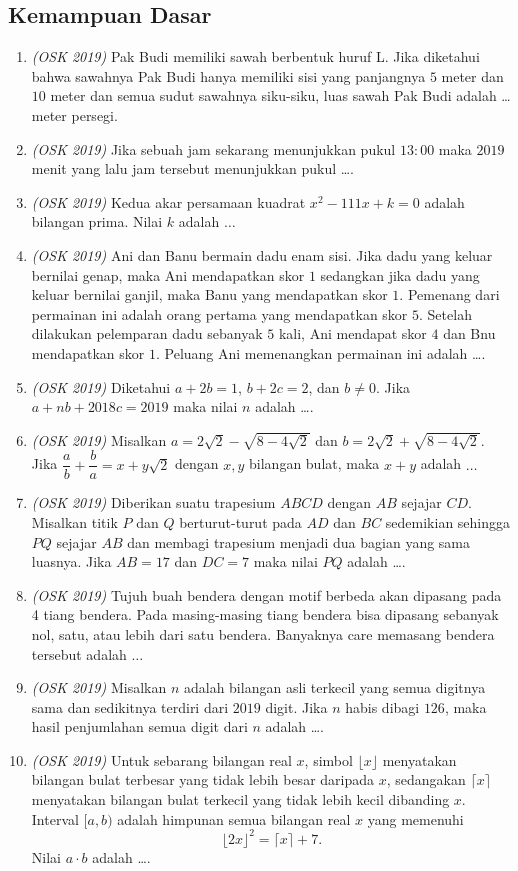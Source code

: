 \subsection{Kemampuan Dasar}
\begin{enumerate}
	\item \textit{(OSK 2019)} Pak Budi memiliki sawah berbentuk huruf L. Jika diketahui bahwa sawahnya Pak Budi hanya memiliki sisi yang panjangnya $5$ meter dan $10$ meter dan semua sudut sawahnya siku-siku, luas sawah Pak Budi adalah \dots meter persegi.
	\item \textit{(OSK 2019)} Jika sebuah jam sekarang menunjukkan pukul $13:00$ maka $2019$ menit yang lalu jam tersebut menunjukkan pukul \dots. 
	\item \textit{(OSK 2019)} Kedua akar persamaan kuadrat $x^2-111x+k=0$ adalah bilangan prima. Nilai $k$ adalah $\dots$
	\item \textit{(OSK 2019)} Ani dan Banu bermain dadu enam sisi. Jika dadu yang keluar bernilai genap, maka Ani mendapatkan skor $1$ sedangkan jika dadu yang keluar bernilai ganjil, maka Banu yang mendapatkan skor $1$. Pemenang dari permainan ini adalah orang pertama yang mendapatkan skor $5$. Setelah dilakukan pelemparan dadu sebanyak $5$ kali, Ani mendapat skor $4$ dan Bnu mendapatkan skor $1$. Peluang Ani memenangkan permainan ini adalah \dots.
	\item \textit{(OSK 2019)} Diketahui $a+2b=1$, $b+2c=2$, dan $b\neq 0$. Jika $a+nb+2018c=2019$ maka nilai $n$ adalah \dots.
	\item \textit{(OSK 2019)} Misalkan $a=2\sqrt{2}-\sqrt{8-4\sqrt{2}}$ dan $b=2\sqrt{2}+\sqrt{8-4\sqrt{2}}$. Jika $\dfrac{a}{b}+\dfrac{b}{a}=x+y\sqrt{2}$ dengan $x,y$ bilangan bulat, maka $x+y$ adalah $\dots$
	\item \textit{(OSK 2019)} Diberikan suatu trapesium $ABCD$ dengan $AB$ sejajar $CD$. Misalkan titik $P$ dan $Q$ berturut-turut pada $AD$ dan $BC$ sedemikian sehingga $PQ$ sejajar $AB$ dan membagi trapesium menjadi dua bagian yang sama luasnya. Jika $AB=17$ dan $DC=7$ maka nilai $PQ$ adalah \dots.
	\item \textit{(OSK 2019)} Tujuh buah bendera dengan motif berbeda akan dipasang pada 4 tiang bendera. Pada masing-masing tiang bendera bisa dipasang sebanyak nol, satu, atau lebih dari satu bendera. Banyaknya care memasang bendera tersebut adalah $\dots$
	\item \textit{(OSK 2019)} Misalkan $n$ adalah bilangan asli terkecil yang semua digitnya sama dan sedikitnya terdiri dari $2019$ digit. Jika $n$ habis dibagi $126$, maka hasil penjumlahan semua digit dari $n$ adalah \dots.
	\item \textit{(OSK 2019)} Untuk sebarang bilangan real $x$, simbol $\lfloor x\rfloor$ menyatakan bilangan bulat terbesar yang tidak lebih besar daripada $x$, sedangakan $\lceil x\rceil$ menyatakan bilangan bulat terkecil yang tidak lebih kecil dibanding $x$. Interval $[a,b)$ adalah himpunan semua bilangan real $x$ yang memenuhi
	$$\lfloor 2x\rfloor^2=\lceil x\rceil+7.$$
	Nilai $a\cdot b$ adalah \dots.
\end{enumerate}

